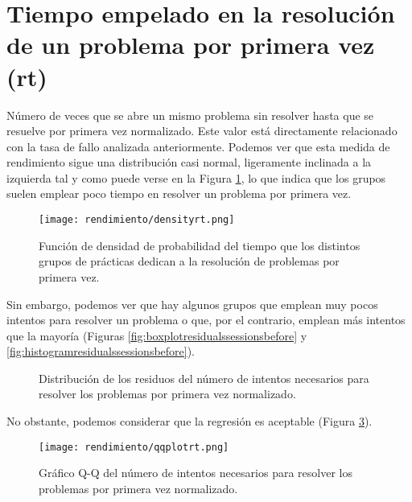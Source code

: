 \section{Tiempo empelado en la resolución de un problema por primera vez (rt)}

Número de veces que se abre un mismo problema sin resolver hasta que se resuelve por primera vez normalizado. Este valor está directamente relacionado con la tasa de fallo analizada anteriormente. Podemos ver que esta medida de rendimiento sigue una distribución casi normal, ligeramente inclinada a la izquierda tal y como puede verse en la Figura \ref{fig:densityplotrt}, lo que indica que los grupos suelen emplear poco tiempo en resolver un problema por primera vez.

\begin{figure}[H]
    \centering
    \texttt{[image: rendimiento/densityrt.png]}
    \caption{Función de densidad de probabilidad del tiempo que los distintos grupos de prácticas dedican a la resolución de problemas por primera vez.}
    \label{fig:densityplotrt}
\end{figure}

Sin embargo, podemos ver que hay algunos grupos que emplean muy pocos intentos para resolver un problema o que, por el contrario, emplean más intentos que la mayoría (Figuras \ref{fig:boxplotresidualssessionsbefore} y \ref{fig:histogramresidualssessionsbefore}).

\begin{figure}[H]
\centering
{}\qquad
{}
\caption{Distribución de los residuos del número de intentos necesarios para resolver los problemas por primera vez normalizado.}
\label{fig:sessionsbefore}
\end{figure}

No obstante, podemos considerar que la regresión es aceptable (Figura \ref{fig:q-qsessionsbefore}).

\begin{figure}[H]
    \centering
    \texttt{[image: rendimiento/qqplotrt.png]}
    \caption{Gráfico Q-Q del número de intentos necesarios para resolver los problemas por primera vez normalizado.}
    \label{fig:q-qsessionsbefore}
\end{figure}

